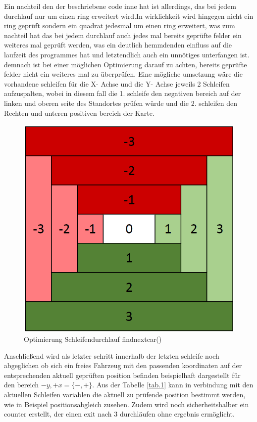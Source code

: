 \documentclass[conference]{IEEEtran}
\begin{document}
Ein nachteil den der beschriebene code inne hat ist allerdings, das bei jedem durchlauf nur um einen ring erweitert wird.In wirklichkeit wird hingegen nicht ein ring geprüft sondern ein quadrat jedesmal um einen ring erweitert, was zum nachteil hat das bei jedem durchlauf auch jedes mal bereits geprüfte felder ein weiteres mal geprüft werden, was ein deutlich hemmdenden einfluss auf die laufzeit des programmes hat und letztendlich auch ein unnötiges unterfangen ist. demnach ist bei einer möglichen Optimierung darauf zu achten, bereits geprüfte felder nicht ein weiteres mal zu überprüfen. Eine mögliche umsetzung wäre die vorhandene schleifen für die X- Achse  und die Y- Achse jeweils 2 Schleifen aufzuspalten, wobei in diesem fall die 1. schleife den negativen bereich auf der linken und oberen seite des Standortes prüfen würde und die 2. schleifen den Rechten und unteren positiven bereich der Karte.
\begin{figure}[h]
\caption{Optimierung Schleifendurchlauf findnextcar()}
\centering
\includegraphics[scale=0.5]{opti_findnextcar}
\end{figure}
Anschließend wird als letzter schritt innerhalb der letzten schleife noch abgeglichen ob sich ein freies Fahrzeug mit den passenden koordinaten auf der entsprechenden aktuell geprüften position befinden beispielhaft dargestellt für den bereich $-y,+x = \{-,+\}$. Aus der Tabelle \ref{tab.1} kann in verbindung mit den  aktuellen Schleifen variablen die aktuell zu prüfende position bestimmt werden, wie in Beispiel positionsabgleich zusehen. Zudem wird noch sicherheitshalber ein counter erstellt, der einen exit nach 3 durchläufen ohne ergebnis ermöglicht. 
\end{document}
